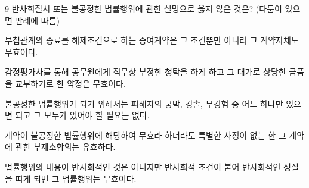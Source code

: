 \begin{question}{9}
반사회질서 또는 불공정한 법률행위에 관한 설명으로 옳지 않은 것은? (다툼이 있으면 판례에 따름)
\begin{choices}
  \item 부첩관계의 종료를 해제조건으로 하는 증여계약은 그 조건뿐만 아니라 그 계약자체도 무효이다.
  \item 감정평가사를 통해 공무원에게 직무상 부정한 청탁을 하게 하고 그 대가로 상당한 금품을 교부하기로 한 약정은 무효이다.
  \item 불공정한 법률행위가 되기 위해서는 피해자의 궁박, 경솔, 무경험 중 어느 하나만 있으면 되고 그 모두가 있어야 할 필요는 없다.
  \item 계약이 불공정한 법률행위에 해당하여 무효라 하더라도 특별한 사정이 없는 한 그 계약에 관한 부제소합의는 유효하다.
  \item 법률행위의 내용이 반사회적인 것은 아니지만 반사회적 조건이 붙어 반사회적인 성질을 띠게 되면 그 법률행위는 무효이다.
\end{choices}
\end{question}
